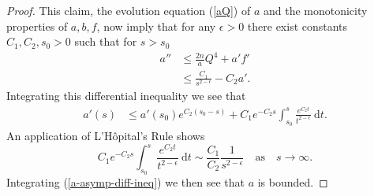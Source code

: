 \documentclass{amsart}
\theoremstyle{definition}
\theoremstyle{remark}
\numberwithin{equation}{section}
\begin{document}
\begin{proof}
This claim, the evolution equation (\ref{aQ}) of $a$ and the monotonicity properties of $a, b, f$, now imply that for any $\epsilon >0$ 
there exist constants $C_1, C_2, s_0>0$ such that for $s>s_0$
\begin{align*}
a''	&\leq \frac{2n}{a}Q^4 + a'f' \\  
    &\leq  \frac{C_1}{s^{2-\epsilon}} - C_2 a'.
\end{align*}
Integrating this differential inequality we see that
\begin{align}
\label{a-asymp-diff-ineq}
a'(s) &\leq a'(s_0) e^{C_2\left(s_0 - s\right)} + C_1 e^{-C_2s} \int_{s_0}^{s} \frac{e^{C_2 t}}{t^{2-\epsilon}} \: \mathrm{d}t.
\end{align}
An application of L'H\^opital's Rule shows
\begin{equation*}
C_1 e^{-C_2s} \int_{s_0}^{s} \frac{e^{C_2 t}}{t^{2-\epsilon}} \: \mathrm{d}t \sim \frac{C_1}{C_2} \frac{1}{s^{2-\epsilon}} \quad \textrm{as} \quad s \rightarrow \infty.
\end{equation*}
Integrating (\ref{a-asymp-diff-ineq}) we then see that $a$ is bounded.
\end{proof}
\end{document}
